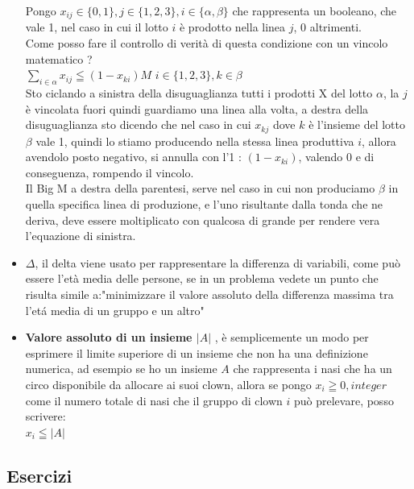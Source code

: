 \documentclass{article}
\begin{document}
\begin{itemize}
Pongo $x_{ij} \in \{0,1\}, j \in \{1,2,3\}, i \in \{\alpha,\beta\} $ che rappresenta un booleano, che vale 1, nel caso in cui il lotto $i$ è prodotto nella linea $j$, 0 altrimenti.\\
Come posso fare il controllo di verità di questa condizione con un vincolo matematico ?\\
$\displaystyle \sum_{i \in \alpha} x_{ij} \leqq (1-x_{ki})M$ $i \in \{1,2,3\}, k \in \beta$\\
Sto ciclando a sinistra della disuguaglianza tutti i prodotti X del lotto $\alpha$, la $j$ è vincolata fuori quindi guardiamo una linea alla volta, a destra della disuguaglianza sto dicendo che nel caso in cui $x_{kj}$ dove $k$ è l'insieme del lotto $\beta$ vale 1, quindi lo stiamo producendo nella stessa linea produttiva $i$, allora avendolo posto negativo, si annulla con l'1 : $(1-x_{ki})$, valendo 0 e di conseguenza, rompendo il vincolo.\\
Il Big M a destra della parentesi, serve nel caso in cui non produciamo $\beta$ in quella specifica linea di produzione, e l'uno risultante dalla tonda che ne deriva, deve essere moltiplicato con qualcosa di grande per rendere vera l'equazione di sinistra.

\item \textbf{$\Delta$}, il delta viene usato per rappresentare la differenza di variabili, come può essere l'età media delle persone, se in un problema vedete un punto che risulta simile a:"minimizzare il valore assoluto della differenza massima tra l'etá media di un gruppo e un altro"

\item \textbf{Valore assoluto di un insieme $|A|$ }, è semplicemente un modo per esprimere il limite superiore di un insieme che non ha una definizione numerica, ad esempio se ho un insieme $A$ che rappresenta i nasi che ha un circo disponibile da allocare ai suoi clown, allora se pongo $x_i \geqq 0, integer$ come il numero totale di nasi che il gruppo di clown $i$ può prelevare, posso scrivere:\\
$x_i \leqq |A|$
\end{itemize}
\newpage
\subsection{Esercizi}
\end{document}
